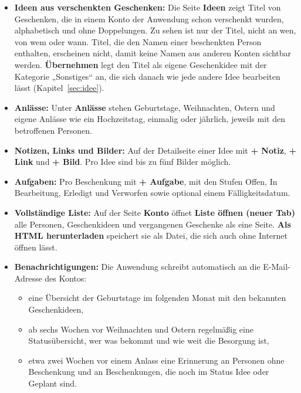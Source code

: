 \documentclass[11pt,a4paper]{article}
\newcommand{\ui}[1]{\textbf{#1}}
\begin{document}
\begin{itemize}
  \item \textbf{Ideen aus verschenkten Geschenken:} Die Seite \ui{Ideen} zeigt Titel von Geschenken, die in einem Konto der Anwendung schon verschenkt wurden, alphabetisch und ohne Doppelungen. Zu sehen ist nur der Titel, nicht an wen, von wem oder wann. Titel, die den Namen einer beschenkten Person enthalten, erscheinen nicht, damit keine Namen aus anderen Konten sichtbar werden. \ui{Übernehmen} legt den Titel als eigene Geschenkidee mit der Kategorie „Sonstiges“ an, die sich danach wie jede andere Idee bearbeiten lässt (Kapitel~\ref{sec:idee}).
  \item \textbf{Anlässe:} Unter \ui{Anlässe} stehen Geburtstage, Weihnachten, Ostern und eigene Anlässe wie ein Hochzeitstag, einmalig oder jährlich, jeweils mit den betroffenen Personen.
  \item \textbf{Notizen, Links und Bilder:} Auf der Detailseite einer Idee mit \ui{+ Notiz}, \ui{+ Link} und \ui{+ Bild}. Pro Idee sind bis zu fünf Bilder möglich.
  \item \textbf{Aufgaben:} Pro Beschenkung mit \ui{+ Aufgabe}, mit den Stufen Offen, In Bearbeitung, Erledigt und Verworfen sowie optional einem Fälligkeitsdatum.
  \item \textbf{Vollständige Liste:} Auf der Seite \ui{Konto} öffnet \ui{Liste öffnen (neuer Tab)} alle Personen, Geschenkideen und vergangenen Geschenke als eine Seite. \ui{Als HTML herunterladen} speichert sie als Datei, die sich auch ohne Internet öffnen lässt.
  \item \textbf{Benachrichtigungen:} Die Anwendung schreibt automatisch an die E-Mail-Adresse des Kontos:
  \begin{itemize}
    \item eine Übersicht der Geburtstage im folgenden Monat mit den bekannten Geschenkideen,
    \item ab sechs Wochen vor Weihnachten und Ostern regelmäßig eine Statusübersicht, wer was bekommt und wie weit die Besorgung ist,
    \item etwa zwei Wochen vor einem Anlass eine Erinnerung an Personen ohne Beschenkung und an Beschenkungen, die noch im Status Idee oder Geplant sind.
  \end{itemize}
\end{itemize}
\end{document}
